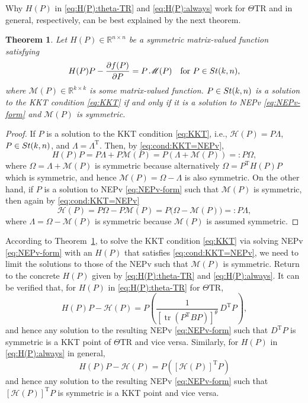 \documentclass[11pt]{article}
\def\bbR{\mathbb{R}}
\def\scrH{\mathscr{H}}
\def\scrM{\mathscr{M}}
\newcommand\STM[2]{{\rm St}(#1,#2)}
\DeclareMathOperator{\tr}{tr}
\DeclareMathOperator{\T}{T}
\newtheorem{theorem}{Theorem}[section]
\theoremstyle{definition}
\numberwithin{equation}{section}
\begin{document}
Why $H(P)$ in \eqref{eq:H(P):theta-TR} and \eqref{eq:H(P):always}  work for $\Theta$TR and
in general, respectively, can be best explained by the next theorem.

\begin{theorem}\label{thm:H(P)-eligibility}
Let $H(P)\in\bbR^{n\times n}$ be a symmetric matrix-valued function satisfying
\begin{equation}\label{eq:cond:KKT=NEPv}
H(P)P-\frac{\partial f(P)}{\partial P}=P\,\scrM(P)\quad\mbox{for $P\in\STM{k}{n}$},
\end{equation}
where $\scrM(P)\in\bbR^{k\times k}$ is some matrix-valued function.
$P\in\STM{k}{n}$ is a solution to the KKT condition \eqref{eq:KKT} if and only if
it is a solution to NEPv \eqref{eq:NEPv-form}
and $\scrM(P)$ is  symmetric.
\end{theorem}

\begin{proof}
If $P$ is a solution to the KKT condition \eqref{eq:KKT}, i.e.,
$\scrH(P)=P\Lambda$, $P\in\STM{k}{n}$, and $\Lambda=\Lambda^{\T}$.
Then, by \eqref{eq:cond:KKT=NEPv},
$$
H(P)P=P\Lambda+P\scrM(P)=P(\Lambda+\scrM(P))=:P\Omega,
$$
where $\Omega=\Lambda+\scrM(P)$ is symmetric because alternatively $\Omega=P^{\T}H(P)P$ which is symmetric, and hence $\scrM(P)=\Omega-\Lambda$ is also symmetric.
On the other hand, if $P$ is a solution to NEPv \eqref{eq:NEPv-form} such that $\scrM(P)$ is  symmetric, then again
by  \eqref{eq:cond:KKT=NEPv}
$$
\scrH(P)=P\Omega-P\scrM(P)=P\big(\Omega-\scrM(P)\big)=:P\Lambda,
$$
where $\Lambda=\Omega-\scrM(P)$ is symmetric because $\scrM(P)$ is assumed symmetric.
\end{proof}


According to Theorem~\ref{thm:H(P)-eligibility}, to solve the KKT condition \eqref{eq:KKT} via solving
NEPv \eqref{eq:NEPv-form} with an $H(P)$ that satisfies \eqref{eq:cond:KKT=NEPv}, we need to limit the solutions to those  of the NEPv such that
$\scrM(P)$ is symmetric.
Return to the concrete $H(P)$ given by \eqref{eq:H(P):theta-TR} and \eqref{eq:H(P):always}. It can be
verified that, for $H(P)$ in \eqref{eq:H(P):theta-TR} for $\Theta$TR,
$$
H(P)P-\scrH(P)=P\left(\frac 1{[\tr(P^{\T}BP)]^{\theta}}\, {D^{\T}P}\right),
$$
and hence any solution to the resulting NEPv \eqref{eq:NEPv-form} such that $D^{\T}P$ is symmetric is a KKT
point of $\Theta$TR and vice versa.
Similarly, for $H(P)$ in \eqref{eq:H(P):always} in general,
$$
H(P)P-\scrH(P)=P([\scrH(P)]^{\T}P)
$$
and hence any solution to the resulting NEPv \eqref{eq:NEPv-form} such that $[\scrH(P)]^{\T}P$ is symmetric is a KKT
point and vice versa.
\end{document}
